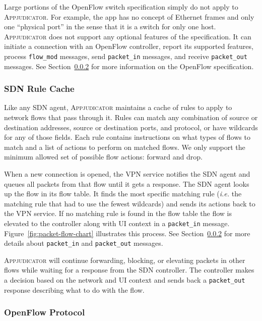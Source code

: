 Large portions of the OpenFlow switch specification simply do not apply to
\textsc{Appjudicator}. For example, the app has no concept of Ethernet frames
and only one ``physical port'' in the sense that it is a switch for only one
host. \textsc{Appjudicator} does not support any optional features of the
specification. It can initiate a connection with an OpenFlow controller, report
its supported features, process \texttt{flow\_mod} messages, send
\texttt{packet\_in} messages, and receive \texttt{packet\_out} messages. See
Section~\ref{sec:openflow-protocol} for more information on the OpenFlow
specification.

\subsubsection{SDN Rule Cache}
\label{sec:implementation-sdn-rule-cache}

Like any SDN agent, \textsc{Appjudicator} maintains a cache of rules to apply to
network flows that pass through it. Rules can match any combination of source or
destination addresses, source or destination ports, and protocol, or have
wildcards for any of those fields. Each rule contains instructions on what types
of flows to match and a list of actions to perform on matched flows. We only
support the minimum allowed set of possible flow actions: forward and drop.

When a new connection is opened, the VPN service notifies the SDN agent and
queues all packets from that flow until it gets a response. The SDN agent looks
up the flow in its flow table. It finds the most specific matching rule
(\textit{i.e.} the matching rule that had to use the fewest wildcards) and sends
its actions back to the VPN service. If no matching rule is found in the flow
table the flow is elevated to the controller along with UI context in a
\texttt{packet\_in} message. Figure~\ref{fig:packet-flow-chart} illustrates this
process. See Section~\ref{sec:openflow-protocol} for more details about
\texttt{packet\_in} and \texttt{packet\_out} messages.

\textsc{Appjudicator} will continue forwarding, blocking, or elevating packets
in other flows while waiting for a response from the SDN controller. The
controller makes a decision based on the network and UI context and sends back a
\texttt{packet\_out} response describing what to do with the flow.

\subsubsection{OpenFlow Protocol}
\label{sec:openflow-protocol}

